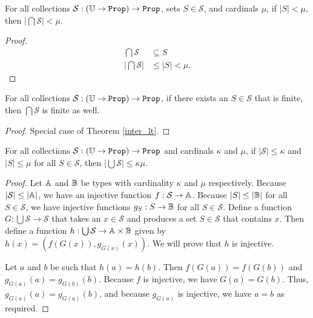 \documentclass[../../math.tex]{subfiles}
\begin{document}
\begin{theorem} \label{inter_lt}
    For all collections $\mathcal S : (\U \to \Prop) \to \Prop$, sets $S \in
    \mathcal S$, and cardinals $\mu$, if $|S| < \mu$, then $|\bigcap \mathcal
    S| < \mu$.
\end{theorem}
\begin{proof}
    \begin{align*}
        \bigcap \mathcal S &\subseteq S \\
        \left|\bigcap \mathcal S\right| &\leq |S| < \mu.
    \end{align*}
\end{proof}

\begin{theorem} \label{finite_inter_finite}
    For all collections $\mathcal S : (\U \to \Prop) \to \Prop$, if there exists
    an $S \in \mathcal S$ that is finite, then $\bigcap \mathcal S$ is finite as
    well.
\end{theorem}
\begin{proof}
    Special case of Theorem \ref{inter_lt}.
\end{proof}

\begin{theorem} \label{union_size_mult}
    For all collections $\mathcal S : (\U \to \Prop) \to \Prop$ and cardinals
    $\kappa$ and $\mu$, if $|\mathcal S| \leq \kappa$ and $|S| \leq \mu$ for all
    $S \in \mathcal S$, then $|\bigcup \mathcal S| \leq \kappa\mu$.
\end{theorem}
\begin{proof}
    Let $\mathbb{A}$ and $\mathbb{B}$ be types with cardinality $\kappa$ and $\mu$ respectively.
    Because $|\mathcal S| \leq |\mathbb{A}|$, we have an injective function $f :
    \mathcal S \to \mathbb{A}$.  Because $|S| \leq |\mathbb{B}|$ for all $S \in \mathcal S$, we
    have injective functions $g_S : S \to \mathbb{B}$ for all $S \in \mathcal S$.
    Define a function $G : \bigcup \mathcal S \to \mathcal S$ that takes an $x
    \in \mathcal S$ and produces a set $S \in \mathcal S$ that contains $x$.
    Then define a function $h : \bigcup \mathcal S \to \mathbb{A} \times \mathbb{B}$ given by
    $h(x) = (f(G(x)), g_{G(x)}(x))$.  We will prove that $h$ is injective.

    Let $a$ and $b$ be such that $h(a) = h(b)$.  Then $f(G(a)) = f(G(b))$ and
    $g_{G(a)}(a) = g_{G(b)}(b)$.  Because $f$ is injective, we have $G(a) =
    G(b)$.  Thus, $g_{G(a)}(a) = g_{G(a)}(b)$, and because $g_{G(a)}$ is
    injective, we have $a = b$ as required.
\end{proof}
\end{document}
